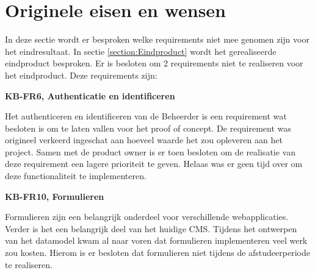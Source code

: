 \section{Originele eisen en wensen}
In deze sectie wordt er besproken welke requirements niet mee genomen zijn voor het eindresultaat.
In sectie \ref{section:Eindproduct} wordt het gerealiseerde eindproduct besproken.
Er is besloten om 2 requirements niet te realiseren voor het eindproduct.
Deze requirements zijn: 

\whitespace
\textbf{KB-FR6, Authenticatie en identificeren}

\whitespace
Het authenticeren en identificeren van de \gls{Beheerder} is een requirement wat besloten is om te laten vallen voor het proof of concept.
De requirement was origineel verkeerd ingeschat aan hoeveel waarde het zou opleveren aan het project.
Samen met de product owner is er toen besloten om de realisatie van deze requirement een lagere prioriteit te geven.
Helaas was er geen tijd over om deze functionaliteit te implementeren.

\whitespace
\textbf{KB-FR10, Formulieren}

\whitespace
Formulieren zijn een belangrijk onderdeel voor verschillende webapplicaties.
Verder is het een belangrijk deel van het huidige \gls{CMS}.
Tijdens het ontwerpen van het datamodel kwam al naar voren dat formulieren implementeren veel werk zou kosten.
Hierom is er besloten dat formulieren niet tijdens de afstudeerperiode te realiseren.
